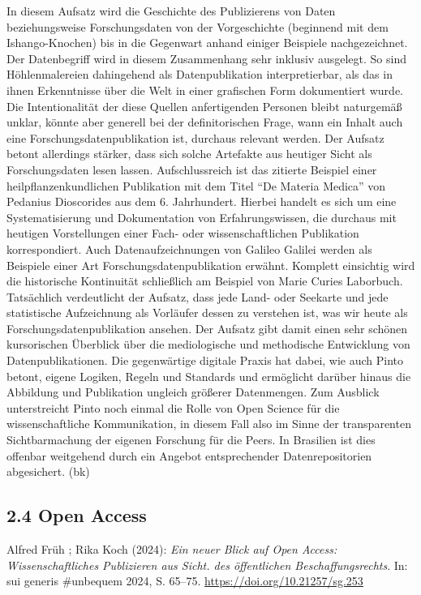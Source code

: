 \documentclass[a4paper,
fontsize=11pt,
oneside,
numbers=noperiodatend,
parskip=half-,
bibliography=totoc,
final
]{scrartcl}
\begin{document}
In diesem Aufsatz wird die Geschichte des Publizierens von Daten
beziehungsweise Forschungsdaten von der Vorgeschichte (beginnend mit dem
Ishango-Knochen) bis in die Gegenwart anhand einiger Beispiele
nachgezeichnet. Der Datenbegriff wird in diesem Zusammenhang sehr
inklusiv ausgelegt. So sind Höhlenmalereien dahingehend als
Datenpublikation interpretierbar, als das in ihnen Erkenntnisse über die
Welt in einer grafischen Form dokumentiert wurde. Die Intentionalität
der diese Quellen anfertigenden Personen bleibt naturgemäß unklar,
könnte aber generell bei der definitorischen Frage, wann ein Inhalt auch
eine Forschungsdatenpublikation ist, durchaus relevant werden. Der
Aufsatz betont allerdings stärker, dass sich solche Artefakte aus
heutiger Sicht als Forschungsdaten lesen lassen. Aufschlussreich ist das
zitierte Beispiel einer heilpflanzenkundlichen Publikation mit dem Titel
\enquote{De Materia Medica} von Pedanius Dioscorides aus dem 6.
Jahrhundert. Hierbei handelt es sich um eine Systematisierung und
Dokumentation von Erfahrungswissen, die durchaus mit heutigen
Vorstellungen einer Fach- oder wissenschaftlichen Publikation
korrespondiert. Auch Datenaufzeichnungen von Galileo Galilei werden als
Beispiele einer Art Forschungsdatenpublikation erwähnt. Komplett
einsichtig wird die historische Kontinuität schließlich am Beispiel von
Marie Curies Laborbuch. Tatsächlich verdeutlicht der Aufsatz, dass jede
Land- oder Seekarte und jede statistische Aufzeichnung als Vorläufer
dessen zu verstehen ist, was wir heute als Forschungsdatenpublikation
ansehen. Der Aufsatz gibt damit einen sehr schönen kursorischen
Überblick über die mediologische und methodische Entwicklung von
Datenpublikationen. Die gegenwärtige digitale Praxis hat dabei, wie auch
Pinto betont, eigene Logiken, Regeln und Standards und ermöglicht
darüber hinaus die Abbildung und Publikation ungleich größerer
Datenmengen. Zum Ausblick unterstreicht Pinto noch einmal die Rolle von
Open Science für die wissenschaftliche Kommunikation, in diesem Fall
also im Sinne der transparenten Sichtbarmachung der eigenen Forschung
für die Peers. In Brasilien ist dies offenbar weitgehend durch ein
Angebot entsprechender Datenrepositorien abgesichert. (bk)

\hypertarget{open-access}{%
\subsection{2.4 Open Access}\label{open-access}}

Alfred Früh ; Rika Koch (2024): \emph{Ein neuer Blick auf Open Access:
Wissenschaftliches Publizieren aus Sicht. des öffentlichen
Beschaffungsrechts}. In: sui generis \#unbequem 2024, S. 65--75.
\url{https://doi.org/10.21257/sg.253}
\end{document}
